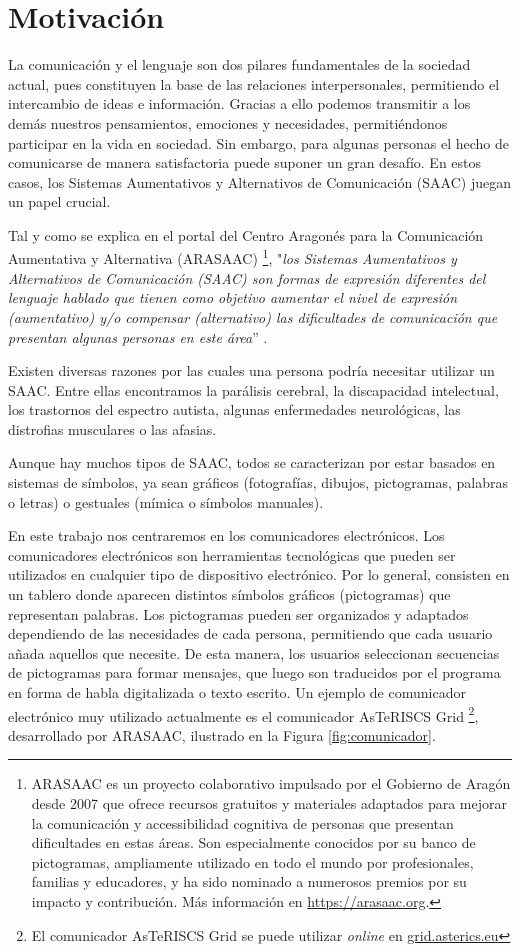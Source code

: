 \documentclass[11pt,spanish,listoffigures,listoftables]{tfgetsinf}
\begin{document}
\section{Motivación}

La comunicación y el lenguaje son dos pilares fundamentales de la sociedad actual, pues constituyen la base de las relaciones interpersonales, permitiendo el intercambio de ideas e información. Gracias a ello podemos transmitir a los demás nuestros pensamientos, emociones y necesidades, permitiéndonos participar en la vida en sociedad. Sin embargo, para algunas personas el hecho de comunicarse de manera satisfactoria puede suponer un gran desafío. En estos casos, los Sistemas Aumentativos y Alternativos de Comunicación (SAAC) juegan un papel crucial.

Tal y como se explica en el portal del Centro Aragonés para la Comunicación Aumentativa y Alternativa (ARASAAC) \footnote{ARASAAC es un proyecto colaborativo impulsado por el Gobierno de Aragón desde 2007 que ofrece recursos gratuitos y materiales adaptados para mejorar la comunicación y accessibilidad cognitiva de personas que presentan dificultades en estas áreas. Son especialmente conocidos por su banco de pictogramas, ampliamente utilizado en todo el mundo por profesionales, familias y educadores, y ha sido nominado a numerosos premios por su impacto y contribución. Más información en \url{https://arasaac.org}.}, "\textit{los Sistemas Aumentativos y Alternativos de Comunicación (SAAC) son formas de expresión diferentes del lenguaje hablado que tienen como objetivo aumentar el nivel de expresión (aumentativo) y/o compensar (alternativo) las dificultades de comunicación que presentan algunas personas en este área}” \cite{arasaac}.

Existen diversas razones por las cuales una persona podría necesitar utilizar un SAAC. Entre ellas encontramos la parálisis cerebral, la discapacidad intelectual, los trastornos del espectro autista, algunas enfermedades neurológicas, las distrofias musculares o las afasias.

Aunque hay muchos tipos de SAAC, todos se caracterizan por estar basados en sistemas de símbolos, ya sean gráficos (fotografías, dibujos, pictogramas, palabras o letras) o gestuales (mímica o símbolos manuales).

En este trabajo nos centraremos en los comunicadores electrónicos. Los comunicadores electrónicos son herramientas tecnológicas que pueden ser utilizados en cualquier tipo de dispositivo electrónico. Por lo general, consisten en un tablero donde aparecen distintos símbolos gráficos (pictogramas) que representan palabras. Los pictogramas pueden ser organizados y adaptados dependiendo de las necesidades de cada persona, permitiendo que cada usuario añada aquellos que necesite. De esta manera, los usuarios seleccionan secuencias de pictogramas para formar mensajes, que luego son traducidos por el programa en forma de habla digitalizada o texto escrito. Un ejemplo de comunicador electrónico muy utilizado actualmente es el comunicador AsTeRISCS Grid \footnote{El comunicador AsTeRISCS Grid se puede utilizar \textit{online} en \url{grid.asterics.eu}}, desarrollado por ARASAAC, ilustrado en la Figura \ref{fig:comunicador}.
\end{document}
